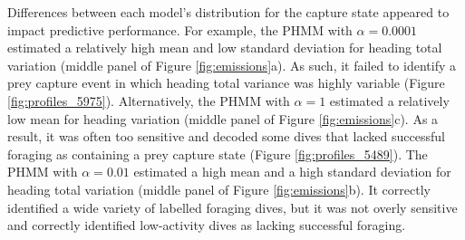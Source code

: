 Differences between each model's distribution for the capture state appeared to impact predictive performance. 
%
For example, the PHMM with $\alpha = 0.0001$ estimated a relatively high mean and low standard deviation for heading total variation (middle panel of Figure \ref{fig:emissions}a). As such, it failed to identify a prey capture event in which heading total variance was highly variable (Figure \ref{fig:profiles_5975}).
%
Alternatively, the PHMM with $\alpha = 1$ estimated a relatively low mean for heading variation (middle panel of Figure \ref{fig:emissions}c). As a result, it was often too sensitive and decoded some dives that lacked successful foraging as containing a prey capture state (Figure \ref{fig:profiles_5489}). 
%
The PHMM with $\alpha = 0.01$ estimated a high mean and a high standard deviation for heading total variation (middle panel of Figure \ref{fig:emissions}b). It correctly identified a wide variety of labelled foraging dives, but it was not overly sensitive and correctly identified low-activity dives as lacking successful foraging.

